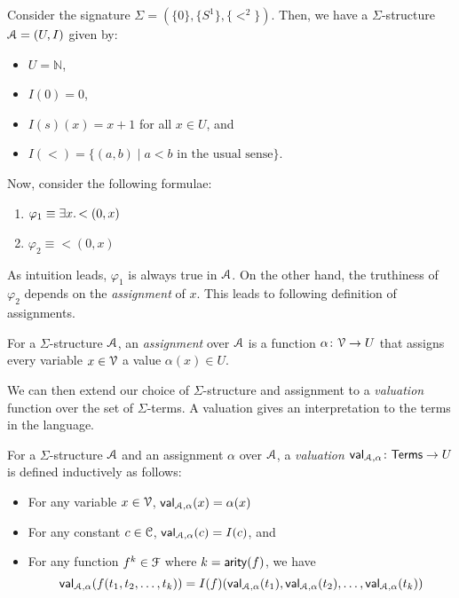 \documentclass[11pt,usenames, dvipsnames]{article}
\DeclareRobustCommand{\euscr}[1]{%
  \text{\usefont{U}{eus}{m}{n}#1}%
}
\begin{document}
\begin{example}
  Consider the signature $\Sigma = (\{0\}, \{S^1\}, \{<^2\})$. Then, we have a $\Sigma$-structure $\euscr{A} = (U, I)$ given by:
  \begin{itemize}
    \item $U = \mathbb{N}$,
    \item $I(0) = 0$,
    \item $I(s)(x) = x + 1$ for all $x \in U$, and
    \item $I(<) = \{(a, b) \mid a < b \text{ in the usual sense}\}$.
  \end{itemize}

  Now, consider the following formulae:
  \begin{enumerate}
    \item $\varphi_1 \equiv \exists x \ldotp <(0, x)$
    \item $\varphi_2 \equiv <(0, x)$
  \end{enumerate}

  As intuition leads, $\varphi_1$ is always true in $\euscr{A}$. On the other hand, the truthiness of $\varphi_2$ depends on the \emph{assignment} of $x$. This leads to following definition of assignments.
\end{example}

\begin{definition}[Assignment]
  For a $\Sigma$-structure $\euscr{A}$, an \emph{assignment} over $\euscr{A}$ is a function $\alpha \colon \vars \to U$ that assigns every variable $x \in \vars$ a value $\alpha(x) \in U$.
\end{definition}

We can then extend our choice of $\Sigma$-structure and assignment to a \emph{valuation} function over the set of $\Sigma$-terms. A valuation gives an interpretation to the terms in the language.

\begin{definition}[Valuation]
  For a $\Sigma$-structure $\euscr{A}$ and an assignment $\alpha$ over $\euscr{A}$, a \emph{valuation} $\textsf{val}_{\euscr{A}, \alpha} \colon \textsf{Terms} \to U$ is defined inductively as follows:
  \begin{itemize}
    \item For any variable $x \in \vars$, $\mathsf{val}_{\euscr{A}, \alpha}(x) = \alpha(x)$
    \item For any constant $c \in \conn$, $\mathsf{val}_{\euscr{A}, \alpha}(c) = I(c)$, and
    \item For any function $f^k \in \func$ where $k = \mathsf{arity}(f)$, we have
    $$
    \mathsf{val}_{\euscr{A}, \alpha}(f(t_1, t_2, \ldots, t_k)) = I(f)(\mathsf{val}_{\euscr{A}, \alpha}(t_1), \mathsf{val}_{\euscr{A}, \alpha}(t_2), \ldots, \mathsf{val}_{\euscr{A}, \alpha}(t_k))$$
  \end{itemize}
\end{definition}
\end{document}
